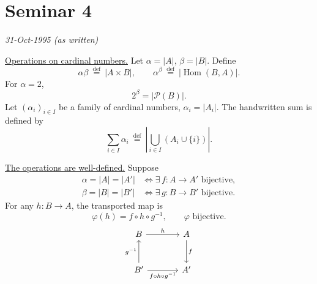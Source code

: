 
\section{Seminar 4}
\begin{flushright}
\textit{31-Oct-1995 (as written)}
\end{flushright}
\begingroup
\setlength{\abovedisplayskip}{5pt}
\setlength{\belowdisplayskip}{5pt}
\setlength{\abovedisplayshortskip}{3pt}
\setlength{\belowdisplayshortskip}{3pt}

\noindent\underline{Operations on cardinal numbers.}
Let $\alpha=|A|$, $\beta=|B|$. Define
\[
  \alpha\beta\ \overset{\mathrm{def}}{=}\ |A\times B|,
  \qquad
  \alpha^{\beta}\ \overset{\mathrm{def}}{=}\
      |\operatorname{Hom}(B,A)|.
\]
For $\alpha=2$,
\[
  2^{\beta}=|\mathcal P(B)|.
\]
Let $(\alpha_i)_{i\in I}$ be a family of cardinal numbers,
$\alpha_i=|A_i|$. The handwritten sum is defined by
\[
  \sum_{i\in I}\alpha_i\ \overset{\mathrm{def}}{=}\
  \left|\bigcup_{i\in I}(A_i\cup\{i\})\right|.
\]

\noindent\underline{The operations are well-defined.}
Suppose
\[
\begin{aligned}
 \alpha=|A|=|A'|&\iff\exists\,f:A\longrightarrow A'\text{ bijective},\\
 \beta=|B|=|B'|&\iff\exists\,g:B\longrightarrow B'\text{ bijective}.
\end{aligned}
\]
For any $h:B\longrightarrow A$, the transported map is
\[
  \varphi(h)=f\circ h\circ g^{-1},\qquad\varphi\text{ bijective}.
\]
\[
\begin{tikzcd}[column sep=large,row sep=large]
 B\arrow[r,"h"] & A\arrow[d,"f"]\\
 B'\arrow[u,"g^{-1}"]\arrow[r,"f\circ h\circ g^{-1}"'] & A'
\end{tikzcd}
\]

